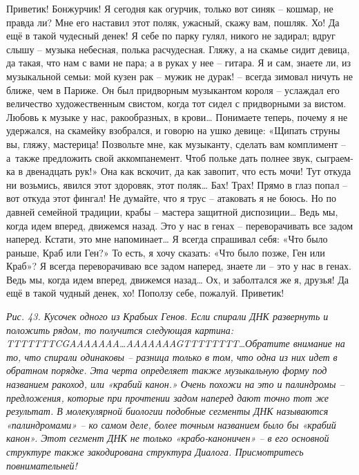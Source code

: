 \documentclass[../main.tex]{subfiles}
\begin{document}
\begin{dialogue}
 Приветик! Бонжурчик! Я сегодня как огурчик, только вот синяк \--- кошмар, не правда ли? Мне его наставил этот поляк, ужасный, скажу вам, пошляк. Хо! Да ещё в такой чудесный денек! Я себе по парку гулял, никого не задирал; вдруг слышу \--- музыка небесная, полька расчудесная. Гляжу, а на скамье сидит девица, да такая, что нам с вами не пара; а в руках у нее \--- гитара. Я и сам, знаете ли, из музыкальной семьи: мой кузен рак \--- мужик не дурак! \--- всегда зимовал ничуть не ближе, чем в Париже. Он был придворным музыкантом короля \--- услаждал его величество художественным свистом, когда тот сидел с придворными за вистом. Любовь к музыке у нас, ракообразных, в крови\ldots{} Понимаете теперь, почему я не удержался, на скамейку взобрался, и говорю на ушко девице: «Щипать струны вы, гляжу, мастерица! Позвольте мне, как музыканту, сделать вам комплимент \--- а~также предложить свой аккомпанемент. Чтоб польке дать полнее звук, сыграем-ка в двенадцать рук!» Она как вскочит, да как завопит, что есть мочи! Тут откуда ни возьмись, явился этот здоровяк, этот поляк\ldots{} Бах! Трах! Прямо в глаз попал \--- вот откуда этот фингал! Не думайте, что я трус \--- атаковать я не боюсь. Но по давней семейной традиции, крабы \--- мастера защитной диспозиции\ldots{} Ведь мы, когда идем вперед, движемся назад. Это у нас в генах \--- переворачивать все задом наперед. Кстати, это мне напоминает\ldots{} Я всегда спрашивал себя: «Что было раньше, Краб или Ген?» То есть, я хочу сказать: «Что было позже, Ген или Краб»? Я всегда переворачиваю все задом наперед, знаете ли \--- это у нас в генах. Ведь мы, когда идем вперед, движемся назад\ldots{} Ох, и заболтался же я, друзья! Да ещё в такой чудный денек, хо! Поползу себе, пожалуй. Приветик!


\emph{Рис. 43. Кусочек одного из Крабьих Генов. Если спирали ДНК развернуть и положить рядом, то получится следующая картина: TTTTTTTCGAAAAAAA\ldots{}AAAAAAAGTTTTTTTT\ldots Обратите внимание на то, что спирали одинаковы \--- разница только в том, что одна из них идет в обратном порядке. Эта черта определяет также музыкальную форму под названием ракоход, или «крабий канон.» Очень похожи на это и палиндромы \--- предложения, которые при прочтении задом наперед дают точно тот же результат. В молекулярной биологии подобные сегменты ДНК называются «палиндромами» \--- ко самом деле, более точным названием было бы «крабий канон». Этот сегмент ДНК не только «крабо-каноничен» \--- в его основной структуре также закодирована структура Диалога. Присмотритесь повнимательней!}


\end{dialogue}
\end{document}

